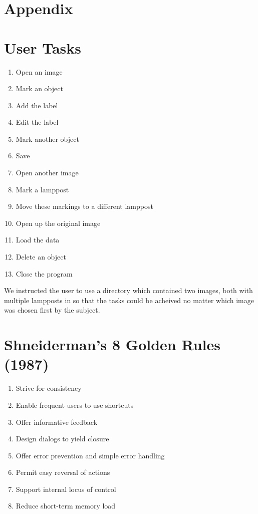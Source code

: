 \documentclass[a4paper,11pt,oneside]{article}
\begin{document}
\newpage
\section{Appendix}
\appendix

\section{User Tasks}
\label{sec:tasks}

\begin{enumerate}
\item Open an image
\item Mark an object
\item Add the label
\item Edit the label
\item Mark another object
\item Save
\item Open another image
\item Mark a lamppost
\item Move these markings to a different lamppost
\item Open up the original image
\item Load the data
\item Delete an object
\item Close the program
\end{enumerate}

We instructed the user to use a directory which contained two images, both with multiple lampposts in so that the tasks could be acheived no matter which image was chosen first by the subject.

\section{Shneiderman’s 8 Golden Rules (1987)}
\label{sec:s_rules}
\begin{enumerate}
\item Strive for consistency
\item Enable frequent users to use shortcuts
\item Offer informative feedback
\item Design dialogs to yield closure
\item Offer error prevention and simple error handling
\item Permit easy reversal of actions
\item Support internal locus of control
\item Reduce short-term memory load 
\end{enumerate}
\end{document}
